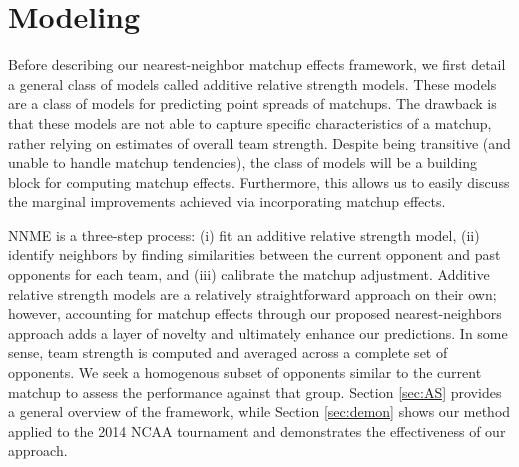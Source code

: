 \documentclass[letterpaper,12pt]{article}
\begin{document}
\section{Modeling\label{sec:NNME}}
Before describing our nearest-neighbor matchup effects framework, we first detail a general class of models called additive relative strength models. These models are a class of models for predicting point spreads of matchups. The drawback is that these models are not able to capture specific characteristics of a matchup, rather relying on estimates of overall team strength. Despite being transitive (and unable to handle matchup tendencies), the class of models will be a building block for computing matchup effects. Furthermore, this allows us to easily discuss the marginal improvements achieved via incorporating matchup effects. 

NNME is a three-step process: (i) fit an additive relative strength model, (ii) identify neighbors by finding similarities between the current opponent and past opponents for each team, and (iii) calibrate the matchup adjustment. Additive relative strength models are a relatively straightforward approach on their own; however, accounting for matchup effects through our proposed nearest-neighbors approach adds a layer of novelty and ultimately enhance our predictions. In some sense, team strength is computed and averaged across a complete set of opponents. We seek a homogenous subset of opponents similar to the current matchup to assess the performance against that group. Section \ref{sec:AS} provides a general overview of the framework, while Section \ref{sec:demon} shows our method applied to the 2014 NCAA tournament and demonstrates the effectiveness of our approach.
\end{document}
